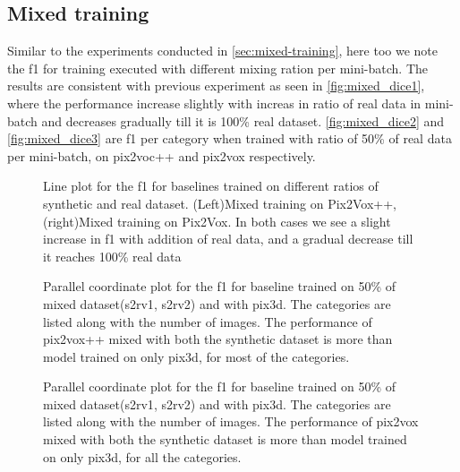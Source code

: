\subsection{Mixed training}\label{subsec:mixed-training-dice}

Similar to the experiments conducted in \autoref{sec:mixed-training}, here too we note the \gls{f1} for training executed with different mixing ration per mini-batch.
The results are consistent with previous experiment as seen in \autoref{fig:mixed_dice1}, where the performance increase slightly with increas in ratio of real data in mini-batch and decreases gradually till it is 100\% real dataset.
\autoref{fig:mixed_dice2} and \autoref{fig:mixed_dice3} are \gls{f1} per category when trained with ratio of 50\% of real data per mini-batch, on pix2voc++ and pix2vox respectively.
\begin{figure}
    \centering
    \resizebox{0.49\linewidth}{!}{}
    \resizebox{0.49\linewidth}{!}{}
    \caption{Line plot for the \gls{f1}  for baselines trained on different ratios of synthetic and real dataset.
        (Left)Mixed training on Pix2Vox++, (right)Mixed training on Pix2Vox. In both cases we see a slight increase in \gls{f1} with addition of real data, and a gradual decrease till it reaches 100\% real data}
    \label{fig:mixed_dice1}
\end{figure}

\begin{figure}
    \centering
    \resizebox{0.7\textwidth}{!}{}
    \caption{Parallel coordinate plot for the \gls{f1} for baseline  trained on 50\% of mixed dataset(\gls{s2rv1}, \gls{s2rv2}) and with pix3d.
    The categories are listed along with the number of images.
    The performance of pix2vox++ mixed with both the synthetic dataset is more than model trained on only pix3d, for most of the categories.
    }
    \label{fig:mixed_dice2}
\end{figure}

\begin{figure}
    \centering
    \resizebox{0.7\textwidth}{!}{}
    \caption{Parallel coordinate plot for the \gls{f1} for baseline  trained on 50\% of mixed dataset(\gls{s2rv1}, \gls{s2rv2}) and with pix3d.
    The categories are listed along with the number of images.
    The performance of pix2vox mixed with both the synthetic dataset is more than model trained on only pix3d, for all the categories.}
    \label{fig:mixed_dice3}
\end{figure}
